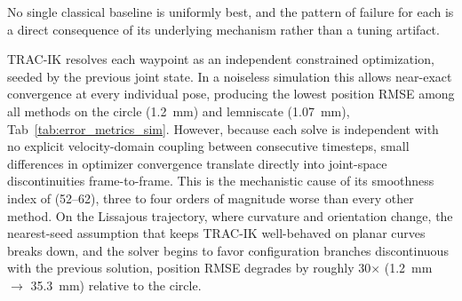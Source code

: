 \documentclass[preprint,12pt]{elsarticle}
\begin{document}
No single classical baseline is uniformly best, and the pattern of
failure for each is a direct consequence of its underlying mechanism
rather than a tuning artifact.

TRAC-IK resolves each waypoint as an independent constrained
optimization, seeded by the previous joint state. In a noiseless
simulation this allows near-exact convergence at every individual pose,
producing the lowest position RMSE among all methods on the circle
(1.2~mm) and lemniscate (1.07~mm), Tab~\ref{tab:error_metrics_sim}. However, because each solve is independent with no explicit velocity-domain coupling between consecutive timesteps, small differences in optimizer convergence translate directly into joint-space discontinuities frame-to-frame. This is the mechanistic cause of its smoothness index of (52--62), three to four orders of magnitude worse than every other method. On the Lissajous trajectory, where curvature and orientation change, the nearest-seed assumption that keeps TRAC-IK well-behaved on planar curves breaks down, and the solver begins to favor configuration branches discontinuous with the previous solution, position RMSE degrades by roughly 30$\times$ (1.2~mm $\rightarrow$ 35.3~mm) relative to the circle.
\end{document}
